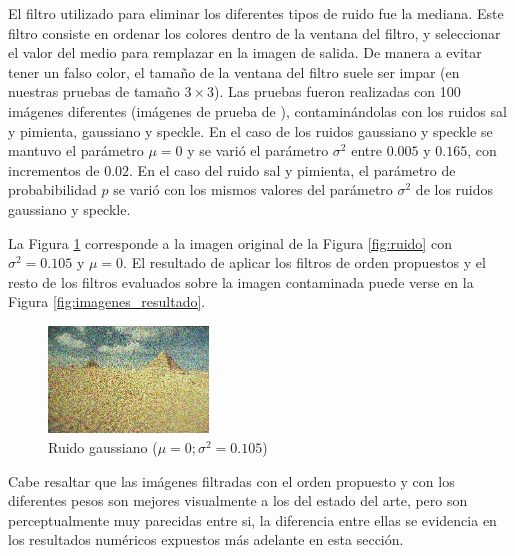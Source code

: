 El filtro utilizado para eliminar los diferentes tipos de ruido fue la mediana. Este filtro consiste en ordenar los colores dentro de la ventana del filtro, y seleccionar el valor del medio para remplazar en la imagen de salida. De manera a evitar tener un falso color, el tama\~no de la ventana del filtro suele ser impar (en nuestras pruebas de tamaño $3\times 3$). Las pruebas fueron realizadas con 100 im\'agenes diferentes (im\'agenes de prueba de \cite{arbelaez2007berkeley}), contaminándolas con los ruidos sal y pimienta, gaussiano y speckle. En el caso de los ruidos gaussiano y speckle se mantuvo el parámetro $\mu = 0$ y se varió el parámetro $\sigma^2$ entre $0.005$ y $0.165$, con incrementos de $0.02$. En el caso del ruido sal y pimienta, el parámetro de probabibilidad $p$ se varió con los mismos valores del parámetro $\sigma^2$ de los ruidos gaussiano y speckle.

La Figura \ref{fig:imagen_ejemplo_ruido_gaussiano} corresponde a la imagen original de la Figura \ref{fig:ruido} con $\sigma^2 = 0.105$ y $\mu = 0$. El resultado de aplicar los filtros de orden propuestos y el resto de los filtros evaluados sobre la imagen contaminada puede verse en la Figura \ref{fig:imagenes_resultado}.


\begin{figure}
	\centering
	\includegraphics[width=0.38\textwidth]{fig/img_ruido_gaussian_83_0_105}
	\caption{Ruido gaussiano ($\mu = 0; \sigma^2 = 0.105$)}
	\label{fig:imagen_ejemplo_ruido_gaussiano}
\end{figure}


Cabe resaltar que las imágenes filtradas con el orden propuesto y con los diferentes pesos son mejores visualmente a los del estado del arte, pero son perceptualmente muy parecidas entre si, la diferencia entre ellas se evidencia en los resultados numéricos expuestos más adelante en esta sección.

